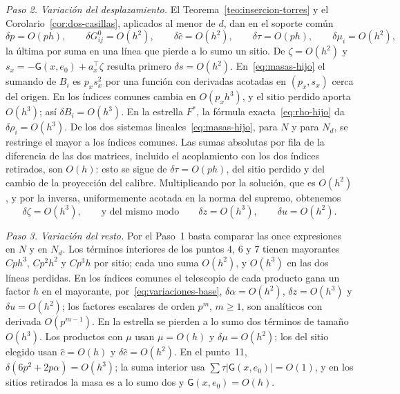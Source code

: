 
\emph{Paso 2. Variación del desplazamiento.} El Teorema~\ref{teo:insercion-torres} y el
Corolario~\ref{cor:dos-casillas}, aplicados al menor de $d$, dan en el soporte común
\begin{equation}\label{eq:variaciones-base}
 \delta p=O(ph),\qquad \delta G^0_{ij}=O(h^2),\qquad \delta\hat c=O(h^2),\qquad
 \delta\tau=O(ph),\qquad \delta\mu_i=O(h^2),
\end{equation}
la última por suma en una línea que pierde a lo sumo un sitio. De $\zeta=O(h^2)$ y
$s_x=-\mathsf G(x,e_0)+a_x^\top\zeta$ resulta primero $\delta s=O(h^2)$. En~\eqref{eq:masas-hijo} el
sumando de $B_i$ es $p_xs_x^2$ por una función con derivadas acotadas en $(p_x,s_x)$ cerca del origen.
En los índices comunes cambia en $O(p_xh^3)$, y el sitio perdido aporta $O(h^3)$; así $\delta
B_i=O(h^3)$. En la estrella $F^*$, la fórmula exacta~\eqref{eq:rho-hijo} da $\delta\rho_i=O(h^3)$. De los
dos sistemas lineales~\eqref{eq:masas-hijo}, para $N$ y para $N_d$, se restringe el mayor a los índices
comunes. Las sumas absolutas por fila de la diferencia de las dos matrices, incluido el acoplamiento
con los dos índices retirados, son $O(h)$: esto se sigue de $\delta\tau=O(ph)$, del sitio perdido y del
cambio de la proyección del calibre. Multiplicando por la solución, que es $O(h^2)$, y por la inversa,
uniformemente acotada en la norma del supremo, obtenemos
\[
 \delta\zeta=O(h^3),\qquad\text{y del mismo modo}\qquad \delta z=O(h^3),\qquad \delta u=O(h^2).
\]

\emph{Paso 3. Variación del resto.} Por el Paso~1 basta comparar las once expresiones en $N$ y en
$N_d$. Los términos interiores de los puntos 4, 6 y 7 tienen mayorantes $Cph^3$, $Cp^2h^2$ y $Cp^3h$
por sitio; cada uno suma $O(h^2)$, y $O(h^3)$ en las dos líneas perdidas. En los índices comunes el
telescopio de cada producto gana un factor $h$ en el mayorante, por~\eqref{eq:variaciones-base},
$\delta\alpha=O(h^2)$, $\delta z=O(h^3)$ y $\delta u=O(h^2)$; los factores escalares de orden $p^m$,
$m\ge1$, son analíticos con derivada $O(p^{m-1})$. En la estrella se pierden a lo sumo dos términos de
tamaño $O(h^3)$. Los productos con $\mu$ usan $\mu=O(h)$ y $\delta\mu=O(h^2)$; los del sitio elegido
usan $\hat c=O(h)$ y $\delta\hat c=O(h^2)$. En el punto~11, $\delta(6p^2+2p\alpha)=O(h^3)$; la suma
interior usa $\sum\tau|\mathsf G(x,e_0)|=O(1)$, y en los sitios retirados la masa es a lo sumo dos y
$\mathsf G(x,e_0)=O(h)$.

